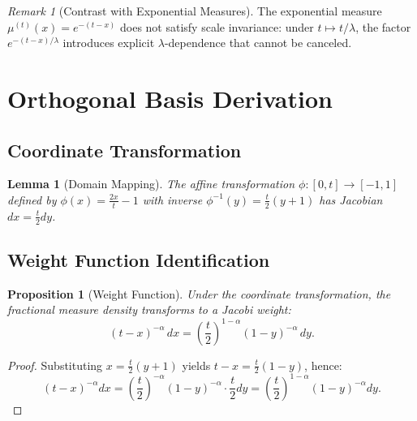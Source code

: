 \documentclass{article}
\theoremstyle{plain}
\newtheorem{proposition}[theorem]{Proposition}
\newtheorem{lemma}[theorem]{Lemma}
\theoremstyle{definition}
\theoremstyle{remark}
\newtheorem{remark}[theorem]{Remark}
\begin{document}
\begin{remark}[Contrast with Exponential Measures]
	The exponential measure $\mu^{(t)}(x) = e^{-(t-x)}$ does not satisfy scale invariance: under $t \mapsto t/\lambda$, the factor $e^{-(t-x)/\lambda}$ introduces explicit $\lambda$-dependence that cannot be canceled.
\end{remark}

\section{Orthogonal Basis Derivation}
\label{app:basis_derivation}

\subsection{Coordinate Transformation}

\begin{lemma}[Domain Mapping]
	\label{lem:domain_mapping}
	The affine transformation $\phi: [0, t] \to [-1, 1]$ defined by $\phi(x) = \frac{2x}{t} - 1$ with inverse $\phi^{-1}(y) = \frac{t}{2}(y + 1)$ has Jacobian $dx = \frac{t}{2} dy$.
\end{lemma}

\subsection{Weight Function Identification}

\begin{proposition}[Weight Function]
	\label{prop:weight_function}
	Under the coordinate transformation, the fractional measure density transforms to a Jacobi weight:
	\begin{equation}
		(t - x)^{-\alpha} \, dx = \left(\frac{t}{2}\right)^{1-\alpha} (1 - y)^{-\alpha} \, dy.
	\end{equation}
\end{proposition}

\begin{proof}
	Substituting $x = \frac{t}{2}(y + 1)$ yields $t - x = \frac{t}{2}(1 - y)$, hence:
	\begin{equation}
		(t - x)^{-\alpha} dx = \left(\frac{t}{2}\right)^{-\alpha} (1 - y)^{-\alpha} \cdot \frac{t}{2} dy = \left(\frac{t}{2}\right)^{1-\alpha} (1 - y)^{-\alpha} dy.
	\end{equation}
\end{proof}
\end{document}
